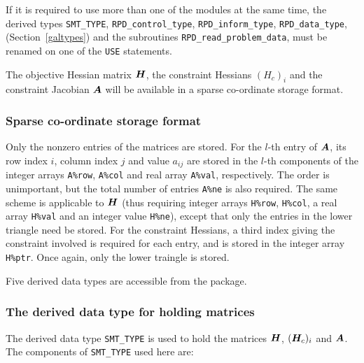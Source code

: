 \documentclass{galahad}
\newcommand{\packagename}{RPD}
\begin{document}


\noindent
If it is required to use more than one of the modules at the same time, 
the derived types
{\tt SMT\_TYPE},
{\tt \packagename\_control\_type},
{\tt \packagename\_inform\_type},
{\tt \packagename\_data\_type},
(Section~\ref{galtypes})
and the subroutines
{\tt \packagename\_read\_problem\_data},
must be renamed on one of the {\tt USE} statements.


\galmatrix
The objective Hessian matrix ${\bm{H}}$, the constraint Hessians $(H_c)_i$ and
the constraint Jacobian ${\bm{A}}$ will be available in a sparse co-ordinate
storage format.

\subsubsection{Sparse co-ordinate storage format}\label{coordinate}
Only the nonzero entries of the matrices are stored. For the
$l$-th entry of ${\bm{A}}$, its row index $i$, column index $j$
and value $a_{ij}$
are stored in the $l$-th components of the integer arrays {\tt A\%row},
{\tt A\%col} and real array {\tt A\%val}, respectively.
The order is unimportant, but the total
number of entries {\tt A\%ne} is also required.
The same scheme is applicable to
${\bm{H}}$ (thus requiring integer arrays {\tt H\%row}, {\tt H\%col}, a real array
{\tt H\%val} and an integer value {\tt H\%ne}),
except that only the entries in the lower triangle need be stored.
For the constraint Hessians, a third index giving the constraint involved
is required for each entry, and is stored in the integer array
{\tt H\%ptr}. Once again, only the lower traingle is stored.





\galtypes
Five derived data types are accessible from the package.


\subsubsection{The derived data type for holding matrices}\label{typesmt}
The derived data type {\tt SMT\_TYPE} is used to hold the matrices
${\bm{H}}$, $({\bm{H}}_c)_i$ and ${\bm{A}}$.
The components of {\tt SMT\_TYPE} used here are:
\end{document}
